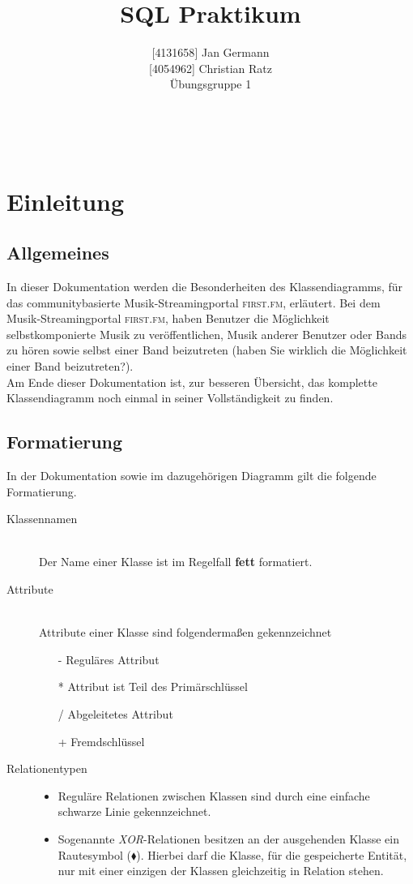 \documentclass[11pt,a4paper,DIV=9]{scrartcl}
\author{{[}4131658{]} Jan Germann \\{[}4054962{]} Christian Ratz\\Übungsgruppe 1}
\title{SQL Praktikum}
\renewcommand{\author}[1]{\renewcommand{\author}{#1}}
\renewcommand{\title}[1]{\renewcommand{\title}{#1}}
\newcommand{\makehomeworktitle}{
  \begin{minipage}[t]{6.5cm}
    \sf{\author}
  \end{minipage}
  \begin{minipage}[t]{6.5cm}
    \begin{flushright}
      \sf{\title\\\today}
    \end{flushright}
  \end{minipage}
  \\[0.2cm]
  \begin{center}
    \sf{
      \color{blue}{
        \LARGE{Dokumentation \blattnr}
      }
    }
  \end{center}
  \vspace{0.1cm}
}
\begin{document}
\makehomeworktitle
\tableofcontents
\newpage
\section{Einleitung}
  \subsection{Allgemeines}
    In dieser Dokumentation werden die Besonderheiten des Klassendiagramms, für das communitybasierte Musik-Streamingportal \textsc{first.fm}, erläutert. Bei dem Musik-Streamingportal \textsc{first.fm}, haben Benutzer die Möglichkeit selbstkomponierte Musik zu veröffentlichen, Musik anderer Benutzer oder Bands zu hören sowie selbst einer Band beizutreten (haben Sie wirklich die M\"oglichkeit einer Band beizutreten?).\\
    Am Ende dieser Dokumentation ist, zur besseren Übersicht, das komplette Klassendiagramm noch einmal in seiner Vollständigkeit zu finden.

  \subsection{Formatierung} 
    In der Dokumentation sowie im dazugehörigen Diagramm gilt die folgende Formatierung.

    \begin{description}
      \item [Klassennamen] \hfill \\
        Der Name einer Klasse ist im Regelfall \textbf{fett} formatiert.
      \item [Attribute] \hfill \\
        Attribute einer Klasse sind folgendermaßen gekennzeichnet
        \begin{itemize}
          \item[-] Reguläres Attribut
          \item[*] Attribut ist Teil des Primärschlüssel
          \item[/] Abgeleitetes Attribut
          \item[+] Fremdschlüssel
        \end{itemize}
      \item[Relationentypen] \hfill
      \begin{itemize}
        \item Reguläre Relationen zwischen Klassen sind durch eine einfache schwarze Linie gekennzeichnet.
        \item Sogenannte \textit{XOR}-Relationen besitzen an der ausgehenden Klasse ein Rautesymbol ($\blacklozenge$). Hierbei darf die Klasse, für die gespeicherte Entität, nur mit einer einzigen der Klassen gleichzeitig in Relation stehen.
      \end{itemize}
    \end{description}
\end{document}
